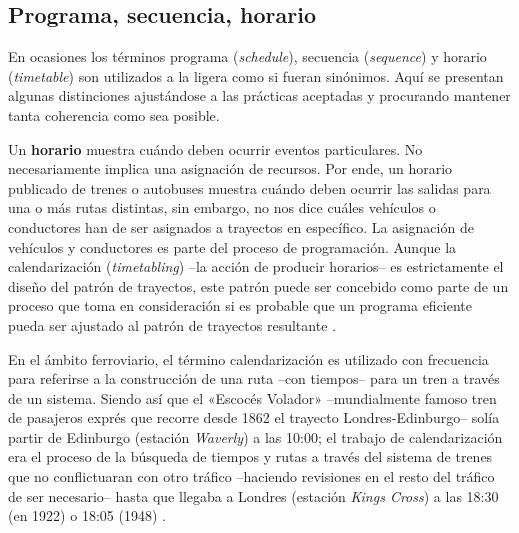 \documentclass[draft,12pt,headsepline,footsepline,paper=letter]{scrreprt}
\begin{document}
\subsection{Programa, secuencia, horario}
\label{sub:programa_secuencia_horario}

En ocasiones los términos programa (\textit{schedule}), secuencia (\textit{sequence}) y horario (\textit{timetable}) son utilizados a la ligera como si fueran sinónimos. Aquí se presentan algunas distinciones ajustándose a las prácticas aceptadas y procurando mantener tanta coherencia como sea posible.

Un \textbf{horario} muestra cuándo deben ocurrir eventos particulares. No necesariamente implica una asignación de recursos. Por ende, un horario publicado de trenes o autobuses muestra cuándo deben ocurrir las salidas para una o más rutas distintas, sin embargo, no nos dice cuáles vehículos o conductores han de ser asignados a trayectos en específico.
%
La asignación de vehículos y conductores es parte del proceso de programación. Aunque la calendarización (\textit{timetabling}) –la acción de producir horarios– es estrictamente el diseño del patrón de trayectos, este patrón puede ser concebido como parte de un proceso que toma en consideración si es probable que un programa eficiente pueda ser ajustado al patrón de trayectos resultante \cite[p.~48]{wren95scheduling-timetabling}.

En el ámbito ferroviario, el término calendarización es utilizado con frecuencia para referirse a la construcción de una ruta –con tiempos– para un tren a través de un sistema. Siendo así que el «Escocés Volador» –mundialmente famoso tren de pasajeros exprés que recorre desde 1862 el trayecto Londres-Edinburgo– solía partir de Edinburgo (estación \textit{Waverly}) a las 10:00; el trabajo de calendarización era el proceso de la búsqueda de tiempos y rutas a través del sistema de trenes que no conflictuaran con otro tráfico –haciendo revisiones en el resto del tráfico de ser necesario– hasta que llegaba a Londres (estación \textit{Kings Cross}) a las 18:30 (en 1922) o 18:05 (1948) 
\citep[p.~48, 49]{wren95scheduling-timetabling}.
\end{document}

